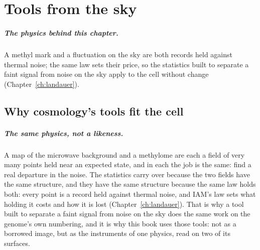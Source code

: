 \chapter{Tools from the sky}\label{ch:skytools}

\paragraph{The physics behind this chapter.} A methyl mark and a fluctuation on the sky are both records held against thermal noise; the same law sets their price, so the statistics built to separate a faint signal from noise on the sky apply to the cell without change (Chapter~\ref{ch:landauer}).

\section{Why cosmology's tools fit the cell}

\paragraph{The same physics, not a likeness.} A map of the microwave background and a methylome are each a field of very many points held near an expected state, and in each the job is the same: find a real departure in the noise. The statistics carry over because the two fields have the same structure, and they have the same structure because the same law holds both: every point is a record held against thermal noise, and IAM's law sets what holding it costs and how it is lost (Chapter~\ref{ch:landauer}). That is why a tool built to separate a faint signal from noise on the sky does the same work on the genome's own numbering, and it is why this book uses those tools: not as a borrowed image, but as the instruments of one physics, read on two of its surfaces.

